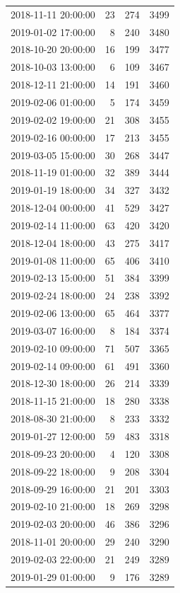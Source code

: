 \begin{tabular}{lrrr}
2018-11-11 20:00:00 & 23 & 274 & 3499 \\
2019-01-02 17:00:00 & 8 & 240 & 3480 \\
2018-10-20 20:00:00 & 16 & 199 & 3477 \\
2018-10-03 13:00:00 & 6 & 109 & 3467 \\
2018-12-11 21:00:00 & 14 & 191 & 3460 \\
2019-02-06 01:00:00 & 5 & 174 & 3459 \\
2019-02-02 19:00:00 & 21 & 308 & 3455 \\
2019-02-16 00:00:00 & 17 & 213 & 3455 \\
2019-03-05 15:00:00 & 30 & 268 & 3447 \\
2018-11-19 01:00:00 & 32 & 389 & 3444 \\
2019-01-19 18:00:00 & 34 & 327 & 3432 \\
2018-12-04 00:00:00 & 41 & 529 & 3427 \\
2019-02-14 11:00:00 & 63 & 420 & 3420 \\
2018-12-04 18:00:00 & 43 & 275 & 3417 \\
2019-01-08 11:00:00 & 65 & 406 & 3410 \\
2019-02-13 15:00:00 & 51 & 384 & 3399 \\
2019-02-24 18:00:00 & 24 & 238 & 3392 \\
2019-02-06 13:00:00 & 65 & 464 & 3377 \\
2019-03-07 16:00:00 & 8 & 184 & 3374 \\
2019-02-10 09:00:00 & 71 & 507 & 3365 \\
2019-02-14 09:00:00 & 61 & 491 & 3360 \\
2018-12-30 18:00:00 & 26 & 214 & 3339 \\
2018-11-15 21:00:00 & 18 & 280 & 3338 \\
2018-08-30 21:00:00 & 8 & 233 & 3332 \\
2019-01-27 12:00:00 & 59 & 483 & 3318 \\
2018-09-23 20:00:00 & 4 & 120 & 3308 \\
2018-09-22 18:00:00 & 9 & 208 & 3304 \\
2018-09-29 16:00:00 & 21 & 201 & 3303 \\
2019-02-10 21:00:00 & 18 & 269 & 3298 \\
2019-02-03 20:00:00 & 46 & 386 & 3296 \\
2018-11-01 20:00:00 & 29 & 240 & 3290 \\
2019-02-03 22:00:00 & 21 & 249 & 3289 \\
2019-01-29 01:00:00 & 9 & 176 & 3289 \\

\end{tabular}
